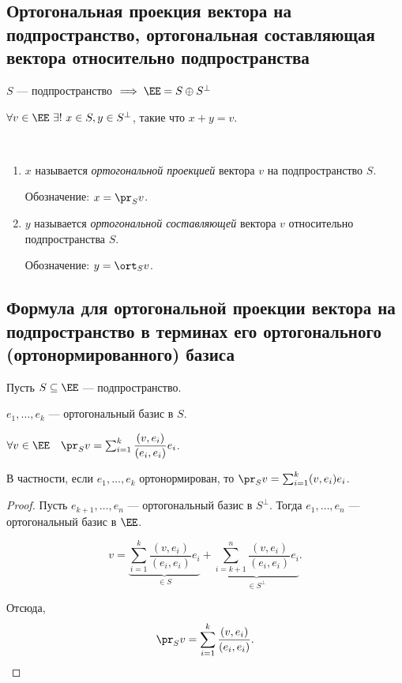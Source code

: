 \subsection{Ортогональная проекция вектора на подпространство, ортогональная составляющая вектора относительно подпространства}

$S$ --- подпространство $ \implies \EE = S \oplus S^{\perp}$

$\forall v \in \EE \ \exists! \ x \in S, y \in S^{\perp}$, такие что $x + y = v$.

\begin{definition}~
    \begin{enumerate}
    \item 
        $x$ называется \textit{ортогональной проекцией} вектора $v$ на подпространство $S$.

        Обозначение: $x = \pr_S v$.

    \item
        $y$ называется \textit{ортогональной составляющей} вектора $v$ относительно подпространства $S$.

        Обозначение: $y = \ort_S v$.
    \end{enumerate}
\end{definition}


\subsection{Формула для ортогональной проекции вектора на подпространство в терминах его ортогонального (ортонормированного) базиса}


Пусть $S \subseteq \EE$ --- подпространство.

$e_1, \dots, e_k$ --- ортогональный базис в $S$.

\begin{proposal}
    $\forall v \in \EE \quad \pr_S v = \sum_{i = 1}^{k} \dfrac{(v, e_i)}{(e_i, e_i)} e_i$.

    В частности, если $e_1, \dots, e_k$ ортонормирован, то $\pr_S v = \sum_{i = 1}^{k} (v, e_i) e_i$.
\end{proposal}

\begin{proof}
    Пусть $e_{k + 1}, \dots, e_n$ --- ортогональный базис в $S^{\perp}$. Тогда $e_1, \dots, e_n$ --- ортогональный базис в $\EE$.

    \begin{equation*}
        v = \underbrace{\sum_{i = 1}^{k} \dfrac{(v, e_i)}{(e_i, e_i)} e_i}_{\in S} + \underbrace{\sum_{i = k + 1}^{n} \dfrac{(v, e_i)}{(e_i, e_i)} e_i}_{\in S^{\perp}}
    .\end{equation*}

    Отсюда,
    \begin{equation*}
        \pr_S v = \sum_{i = 1}^{k} \dfrac{(v, e_i)}{(e_i, e_i)}
    .\qedhere\end{equation*}
\end{proof}


